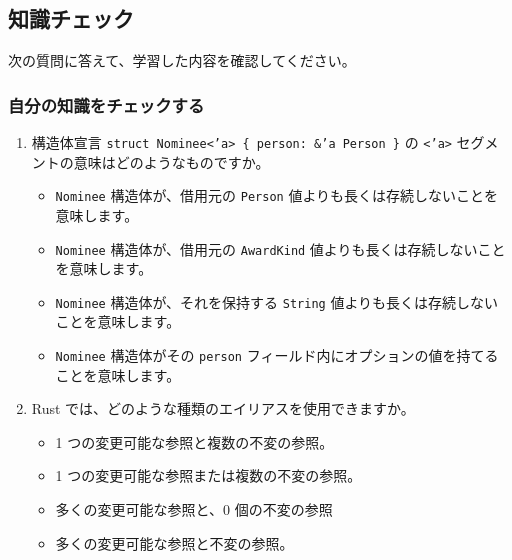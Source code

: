 \subsection{知識チェック}

次の質問に答えて、学習した内容を確認してください。

\subsubsection{自分の知識をチェックする}

\begin{enumerate}

\item 構造体宣言 \texttt{struct Nominee<'a> \{ person: \&'a Person \}} の \texttt{<'a>} セグメントの意味はどのようなものですか。

\begin{itemize}
\item \texttt{Nominee} 構造体が、借用元の \texttt{Person} 値よりも長くは存続しないことを意味します。

\item \texttt{Nominee} 構造体が、借用元の \texttt{AwardKind} 値よりも長くは存続しないことを意味します。

\item \texttt{Nominee} 構造体が、それを保持する \texttt{String} 値よりも長くは存続しないことを意味します。

\item \texttt{Nominee} 構造体がその \texttt{person} フィールド内にオプションの値を持てることを意味します。
\end{itemize}
\item Rust では、どのような種類のエイリアスを使用できますか。

\begin{itemize}
\item 1 つの変更可能な参照と複数の不変の参照。

\item 1 つの変更可能な参照または複数の不変の参照。

\item 多くの変更可能な参照と、0 個の不変の参照

\item 多くの変更可能な参照と不変の参照。
\end{itemize}

\end{enumerate}





